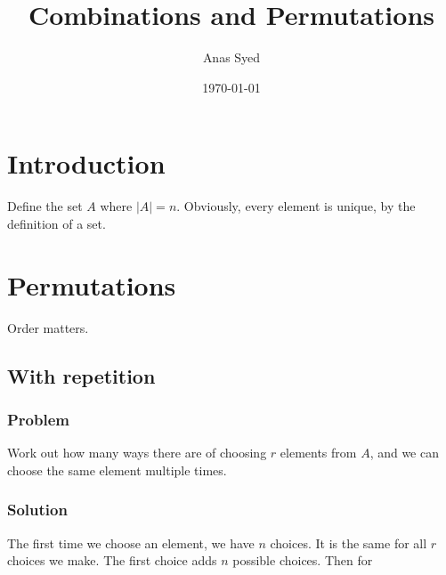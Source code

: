 \documentclass[a4paper,12pt]{article}
\title{Combinations and Permutations}
\date{\today}
\author{Anas Syed}
\begin{document}
\maketitle
\tableofcontents
\newpage
\section{Introduction}
Define the set $A$ where $|A|=n$. Obviously, every element is unique, by the definition of a set.
\section{Permutations}
Order matters.
\subsection{With repetition}
\subsubsection{Problem}
Work out how many ways there are of choosing $r$ elements from $A$, and we can choose the same element multiple times.

\subsubsection{Solution}
The first time we choose an element, we have $n$ choices. It is the same for all $r$ choices we make. The first choice adds $n$ possible choices. Then for 


\end{document}
